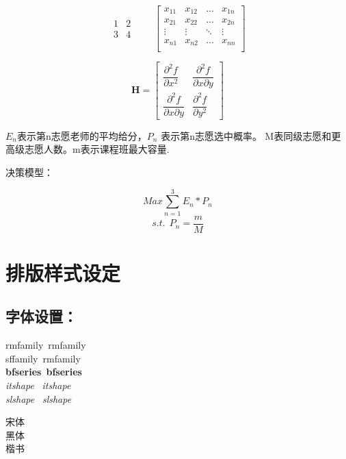 \documentclass[10pt,a4paper,twocolumn]{book}
\begin{document}

\[ 
\begin{matrix} 
1 & 2 \\ 3 & 4
\end{matrix} 
\qquad \begin{bmatrix}
x_{11} & x_{12} & \ldots & x_{1n}\\
x_{21} & x_{22} & \ldots & x_{2n}\\
\vdots & \vdots & \ddots & \vdots\\
x_{n1} & x_{n2} & \ldots & x_{nn}\\
 \end{bmatrix}
\]

\[ 
\mathbf{H}= \begin{bmatrix} 
\dfrac{\partial^2 f}{\partial x^2} & 
\dfrac{\partial^2 f}
{\partial x \partial y} \\[8pt] 
\dfrac{\partial^2 f}
{\partial x \partial y} & 
\dfrac{\partial^2 f}{\partial y^2} 
\end{bmatrix}
\]

$E_n$表示第n志愿老师的平均给分，$P_n$ 表示第n志愿选中概率。
M表同级志愿和更高级志愿人数。m表示课程班最大容量.

决策模型：

\[ Max \sum_{n = 1}^{3} E_n * P_n \] 
\[s.t.~~P_n= \frac{m}{M}\]

\chapter{排版样式设定}

\section{字体设置：}
{\rmfamily rmfamily}~\textrm{rmfamily}\\
{\sffamily sffamily}~\textsf{rmfamily}\\
{\bfseries bfseries}~\textbf{bfseries}\\
{\itshape itshape}  ~\textit{itshape}\\
{\slshape slshape}  ~\textsl{slshape}

{\songti 宋体}\\
{\heiti 黑体}\\
{\kaishu 楷书}\\
\end{document}

